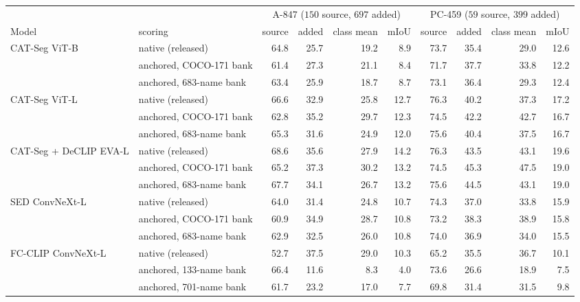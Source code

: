 \setlength{\tabcolsep}{4pt}\begin{tabular}{@{}llrrrrrrrr@{}}
\toprule
& & \multicolumn{4}{c}{A-847 ($150$ source, $697$ added)} & \multicolumn{4}{c}{PC-459 ($59$ source, $399$ added)} \\ \cmidrule(lr){3-6}\cmidrule(l){7-10}
Model & scoring & source & added & class mean & mIoU & source & added & class mean & mIoU \\
\midrule
CAT-Seg ViT-B & native (released) & 64.8 & 25.7 & 19.2 & 8.9 & 73.7 & 35.4 & 29.0 & 12.6 \\
 & anchored, COCO-171 bank & 61.4 & 27.3 & 21.1 & 8.4 & 71.7 & 37.7 & 33.8 & 12.2 \\
 & anchored, 683-name bank & 63.4 & 25.9 & 18.7 & 8.7 & 73.1 & 36.4 & 29.3 & 12.4 \\
\midrule
CAT-Seg ViT-L & native (released) & 66.6 & 32.9 & 25.8 & 12.7 & 76.3 & 40.2 & 37.3 & 17.2 \\
 & anchored, COCO-171 bank & 62.8 & 35.2 & 29.7 & 12.3 & 74.5 & 42.2 & 42.7 & 16.7 \\
 & anchored, 683-name bank & 65.3 & 31.6 & 24.9 & 12.0 & 75.6 & 40.4 & 37.5 & 16.7 \\
\midrule
CAT-Seg + DeCLIP EVA-L & native (released) & 68.6 & 35.6 & 27.9 & 14.2 & 76.3 & 43.5 & 43.1 & 19.6 \\
 & anchored, COCO-171 bank & 65.2 & 37.3 & 30.2 & 13.2 & 74.5 & 45.3 & 47.5 & 19.0 \\
 & anchored, 683-name bank & 67.7 & 34.1 & 26.7 & 13.2 & 75.6 & 44.5 & 43.1 & 19.0 \\
\midrule
SED ConvNeXt-L & native (released) & 64.0 & 31.4 & 24.8 & 10.7 & 74.3 & 37.0 & 33.8 & 15.9 \\
 & anchored, COCO-171 bank & 60.9 & 34.9 & 28.7 & 10.8 & 73.2 & 38.3 & 38.9 & 15.8 \\
 & anchored, 683-name bank & 62.9 & 32.5 & 26.0 & 10.8 & 74.0 & 36.9 & 34.0 & 15.5 \\
\midrule
FC-CLIP ConvNeXt-L & native (released) & 52.7 & 37.5 & 29.0 & 10.3 & 65.2 & 35.5 & 36.7 & 10.1 \\
 & anchored, 133-name bank & 66.4 & 11.6 & 8.3 & 4.0 & 73.6 & 26.6 & 18.9 & 7.5 \\
 & anchored, 701-name bank & 61.7 & 23.2 & 17.0 & 7.7 & 69.8 & 31.4 & 31.5 & 9.8 \\
\bottomrule
\end{tabular}
